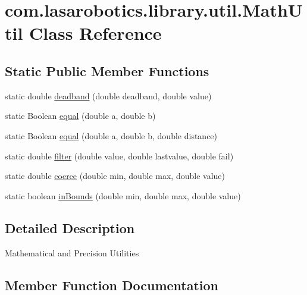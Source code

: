 \hypertarget{classcom_1_1lasarobotics_1_1library_1_1util_1_1_math_util}{}\section{com.\+lasarobotics.\+library.\+util.\+Math\+Util Class Reference}
\label{classcom_1_1lasarobotics_1_1library_1_1util_1_1_math_util}
\subsection*{Static Public Member Functions}
\begin{DoxyCompactItemize}
\item 
static double \hyperlink{classcom_1_1lasarobotics_1_1library_1_1util_1_1_math_util_a4669403ad7a53281e54642b19c854969}{deadband} (double deadband, double value)
\item 
static Boolean \hyperlink{classcom_1_1lasarobotics_1_1library_1_1util_1_1_math_util_a237a2132ae1166ad3860162c43772c8d}{equal} (double a, double b)
\item 
static Boolean \hyperlink{classcom_1_1lasarobotics_1_1library_1_1util_1_1_math_util_a4a0d5166631ce63f29831cddcc93606c}{equal} (double a, double b, double distance)
\item 
static double \hyperlink{classcom_1_1lasarobotics_1_1library_1_1util_1_1_math_util_ad4f61bfb6db04221bfa2ae604294212b}{filter} (double value, double lastvalue, double fail)
\item 
static double \hyperlink{classcom_1_1lasarobotics_1_1library_1_1util_1_1_math_util_ad104d4e18dfb7085f1df06cc06e1181d}{coerce} (double min, double max, double value)
\item 
static boolean \hyperlink{classcom_1_1lasarobotics_1_1library_1_1util_1_1_math_util_abf940081e2bc48457b82db587b9e19cd}{in\+Bounds} (double min, double max, double value)
\end{DoxyCompactItemize}


\subsection{Detailed Description}
Mathematical and Precision Utilities 

\subsection{Member Function Documentation}
\hypertarget{classcom_1_1lasarobotics_1_1library_1_1util_1_1_math_util_ad104d4e18dfb7085f1df06cc06e1181d}{}
